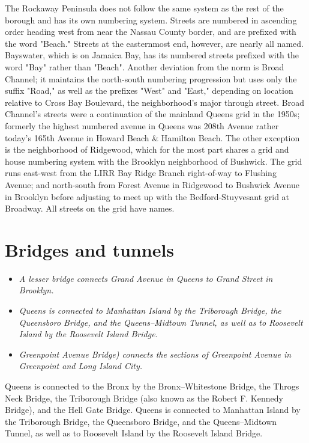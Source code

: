 The Rockaway Peninsula does not follow the same system as the rest of
the borough and has its own numbering system. Streets are numbered in
ascending order heading west from near the Nassau County border, and are
prefixed with the word "Beach." Streets at the easternmost end, however,
are nearly all named. Bayswater, which is on Jamaica Bay, has its
numbered streets prefixed with the word "Bay" rather than "Beach".
Another deviation from the norm is Broad Channel; it maintains the
north-south numbering progression but uses only the suffix "Road," as
well as the prefixes "West" and "East," depending on location relative
to Cross Bay Boulevard, the neighborhood's major through street. Broad
Channel's streets were a continuation of the mainland Queens grid in the
1950s; formerly the highest numbered avenue in Queens was 208th Avenue
rather today's 165th Avenue in Howard Beach \& Hamilton Beach. The other
exception is the neighborhood of Ridgewood, which for the most part
shares a grid and house numbering system with the Brooklyn neighborhood
of Bushwick. The grid runs east-west from the LIRR Bay Ridge Branch
right-of-way to Flushing Avenue; and north-south from Forest Avenue in
Ridgewood to Bushwick Avenue in Brooklyn before adjusting to meet up
with the Bedford-Stuyvesant grid at Broadway. All streets on the grid
have names.

\section{Bridges and tunnels}\label{bridges-and-tunnels}

\begin{itemize}
\item
  \emph{A lesser bridge connects Grand Avenue in Queens to Grand Street
  in Brooklyn.}
\item
  \emph{Queens is connected to Manhattan Island by the Triborough
  Bridge, the Queensboro Bridge, and the Queens--Midtown Tunnel, as well
  as to Roosevelt Island by the Roosevelt Island Bridge.}
\item
  \emph{Greenpoint Avenue Bridge) connects the sections of Greenpoint
  Avenue in Greenpoint and Long Island City.}
\end{itemize}

Queens is connected to the Bronx by the Bronx--Whitestone Bridge, the
Throgs Neck Bridge, the Triborough Bridge (also known as the Robert F.
Kennedy Bridge), and the Hell Gate Bridge. Queens is connected to
Manhattan Island by the Triborough Bridge, the Queensboro Bridge, and
the Queens--Midtown Tunnel, as well as to Roosevelt Island by the
Roosevelt Island Bridge.

